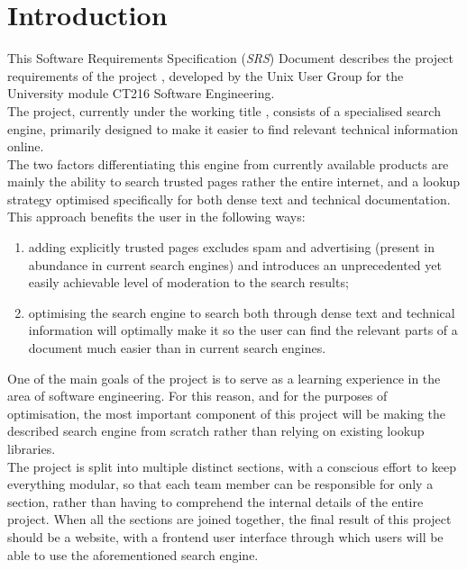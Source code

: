 \section{Introduction}

This Software Requirements Specification (\textit{SRS}) Document describes the project requirements of the project \projectname, 
developed by the Unix User Group for the University module CT216 Software Engineering. \\

The project, currently under the working title \projectname, consists of a specialised search engine, primarily designed to make it easier to find relevant technical information online. \\

The two factors differentiating this engine from currently available products are mainly the ability to search trusted pages rather the entire internet, 
and a lookup strategy optimised specifically for both dense text and technical documentation.
This approach benefits the user in the following ways:
\begin{enumerate}
    \item adding explicitly trusted pages excludes spam and advertising (present in abundance in current search engines) and introduces an unprecedented yet easily achievable level of moderation to the search results;
    \item optimising the search engine to search both through dense text and technical information will optimally make it so the user can find the relevant parts of a document much easier than in current search engines.
\end{enumerate}

One of the main goals of the project is to serve as a learning experience in the area of software engineering. For this reason, and for the purposes of optimisation,
the most important component of this project will be making the described search engine from scratch rather than relying on existing lookup libraries. \\

The project is split into multiple distinct sections, with a conscious effort to keep everything modular, so that each team member can be responsible for only a section,
rather than having to comprehend the internal details of the entire project.
When all the sections are joined together, the final result of this project should be a website, with a frontend user interface through which users will be able to use the aforementioned search engine. \\

